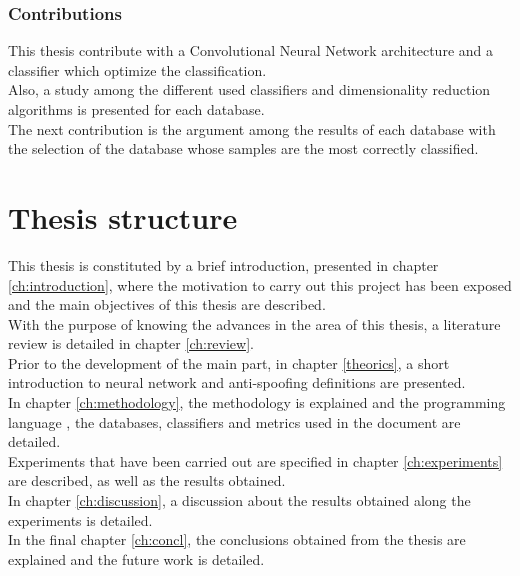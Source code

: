 \subsubsection{Contributions}
This thesis contribute with a Convolutional Neural Network architecture and a classifier which optimize the classification.\\

Also, a study among the different used classifiers and dimensionality reduction algorithms is presented for each database.\\

The next contribution is the argument among the results of each database with the selection of the database whose samples are the most correctly classified.\\

\section{Thesis structure}
This thesis is constituted by a brief introduction, presented in chapter \ref{ch:introduction}, where the motivation to carry out this project has been exposed and the main objectives of this thesis are described.\\

With the purpose of knowing the advances in the area of this thesis, a literature review is detailed in chapter \ref{ch:review}.\\

Prior to the development of the main part, in chapter \ref{theorics}, a short introduction to neural network and anti-spoofing definitions are presented.\\

In chapter \ref{ch:methodology}, the methodology is explained and the programming language , the databases, classifiers and metrics used in the document are detailed.\\

Experiments that have been carried out are specified in chapter \ref{ch:experiments} are described, as well as the results obtained.\\


In chapter \ref{ch:discussion}, a discussion about the results obtained along the experiments is detailed.\\ 

In the final chapter \ref{ch:concl}, the conclusions obtained from the thesis are explained and the future work is detailed.\\
